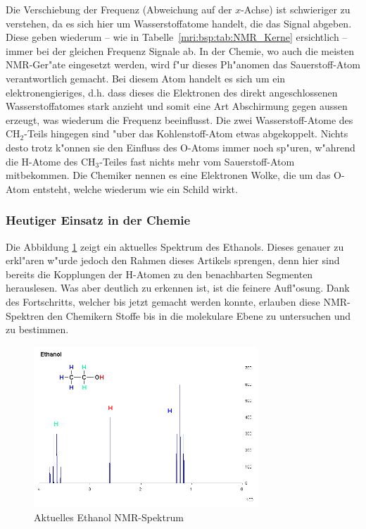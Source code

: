 Die Verschiebung der Frequenz (Abweichung auf der $x$-Achse) ist
schwieriger zu verstehen, da es sich hier um Wasserstoffatome
handelt, die das Signal abgeben. Diese geben wiederum -- wie in
Tabelle~\ref{mri:bsp:tab:NMR_Kerne} ersichtlich -- immer bei der
gleichen Frequenz Signale ab. In der Chemie, wo auch die meisten
NMR-Ger"ate eingesetzt werden, wird f"ur dieses Ph"anomen das
Sauerstoff-Atom verantwortlich gemacht. Bei diesem Atom handelt es
sich um ein elektronengieriges, d.h. dass dieses die Elektronen des
direkt angeschlossenen Wasserstoffatomes stark anzieht und somit
eine Art Abschirmung gegen aussen erzeugt, was wiederum die Frequenz
beeinflusst. Die zwei Wasserstoff-Atome des $\mathrm{CH_2}$-Teils
hingegen sind "uber das Kohlenstoff-Atom etwas abgekoppelt. Nichts
desto trotz k"onnen sie den Einfluss des O-Atoms immer noch sp"uren,
w"ahrend die H-Atome des $\mathrm{CH_3}$-Teiles fast nichts mehr
vom Sauerstoff-Atom mitbekommen. Die Chemiker nennen es eine
Elektronen Wolke, die um das O-Atom entsteht, welche wiederum wie
ein Schild wirkt.

\subsubsection{Heutiger Einsatz in der Chemie}
Die Abbildung \ref{mri:bsp:abb:EtanolspektrumNew} zeigt ein aktuelles
Spektrum des Ethanols.
Dieses genauer zu erkl"aren w"urde jedoch
den Rahmen dieses Artikels sprengen, denn hier sind bereits die
Kopplungen der H-Atomen zu den benachbarten Segmenten herauslesen.
Was aber deutlich zu erkennen ist, ist die feinere Aufl"osung. Dank
des Fortschritts, welcher bis jetzt gemacht werden konnte, erlauben
diese NMR-Spektren den Chemikern Stoffe bis in die molekulare Ebene
zu untersuchen und zu bestimmen.
\begin{figure}
	\centering
	\includegraphics[width = 0.75\textwidth]{./mri/pic/CW_SpektrumEthanol_Neu.png}
	\caption{Aktuelles Ethanol NMR-Spektrum \cite{skript:mri:EthanolNeu}}
	\label{mri:bsp:abb:EtanolspektrumNew}
\end{figure}
